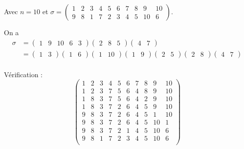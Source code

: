 \begin{exm}
	Avec $n = 10$ et $\sigma = \begin{pmatrix}
		1&2&3&4&5&6&7&8&9&10\\
		9&8&1&7&2&3&4&5&10&6
	\end{pmatrix}$.

	On a
	\begin{align*}
		\sigma &= \begin{pmatrix}
			1&9&10&6&3
		\end{pmatrix} \begin{pmatrix}
			2&8&5
		\end{pmatrix} \begin{pmatrix}
			4&7
		\end{pmatrix}\\
		&= \begin{pmatrix}
			1&3
		\end{pmatrix} \begin{pmatrix}
			1&6
		\end{pmatrix} \begin{pmatrix}
			1&10
		\end{pmatrix} \begin{pmatrix}
			1&9
		\end{pmatrix} \begin{pmatrix}
			2&5
		\end{pmatrix} \begin{pmatrix}
			2&8
		\end{pmatrix} \begin{pmatrix}
			4&7
		\end{pmatrix} \\
	\end{align*}

	Vérification : \[
		\begin{pmatrix}
			1&2&3&4&5&6&7&8&9&10\\
			1&2&3&7&5&6&4&8&9&10\\
			1&8&3&7&5&6&4&2&9&10\\
			1&8&3&7&2&6&4&5&9&10\\
			9&8&3&7&2&6&4&5&1&10\\
			9&8&3&7&2&6&4&5&10&1\\
			9&8&3&7&2&1&4&5&10&6\\
			9&8&1&7&2&3&4&5&10&6\\
		\end{pmatrix} 
	\] 
\end{exm}
